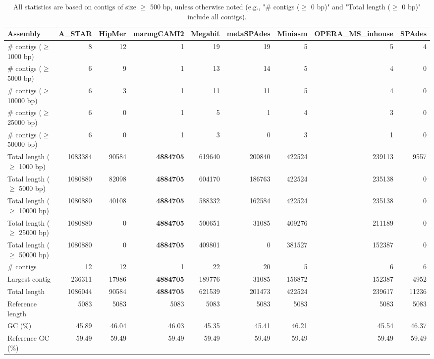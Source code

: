 \documentclass[12pt,a4paper]{article}
\begin{document}
\begin{table}[ht]
\begin{center}
\caption{All statistics are based on contigs of size $\geq$ 500 bp, unless otherwise noted (e.g., "\# contigs ($\geq$ 0 bp)" and "Total length ($\geq$ 0 bp)" include all contigs).}
\begin{tabular}{|l*{8}{|r}|}
\hline
Assembly & A\_STAR & HipMer & marmgCAMI2 & Megahit & metaSPAdes & Miniasm & OPERA\_MS\_inhouse & SPAdes \\ \hline
\# contigs ($\geq$ 1000 bp) & 8 & 12 & 1 & 19 & 19 & 5 & 5 & 4 \\ \hline
\# contigs ($\geq$ 5000 bp) & 6 & 9 & 1 & 13 & 14 & 5 & 4 & 0 \\ \hline
\# contigs ($\geq$ 10000 bp) & 6 & 3 & 1 & 11 & 11 & 5 & 4 & 0 \\ \hline
\# contigs ($\geq$ 25000 bp) & 6 & 0 & 1 & 5 & 1 & 4 & 3 & 0 \\ \hline
\# contigs ($\geq$ 50000 bp) & 6 & 0 & 1 & 3 & 0 & 3 & 1 & 0 \\ \hline
Total length ($\geq$ 1000 bp) & 1083384 & 90584 & {\bf 4884705} & 619640 & 200840 & 422524 & 239113 & 9557 \\ \hline
Total length ($\geq$ 5000 bp) & 1080880 & 82098 & {\bf 4884705} & 604170 & 186763 & 422524 & 235138 & 0 \\ \hline
Total length ($\geq$ 10000 bp) & 1080880 & 40108 & {\bf 4884705} & 588332 & 162584 & 422524 & 235138 & 0 \\ \hline
Total length ($\geq$ 25000 bp) & 1080880 & 0 & {\bf 4884705} & 500651 & 31085 & 409276 & 211189 & 0 \\ \hline
Total length ($\geq$ 50000 bp) & 1080880 & 0 & {\bf 4884705} & 409801 & 0 & 381527 & 152387 & 0 \\ \hline
\# contigs & 12 & 12 & 1 & 22 & 20 & 5 & 6 & 6 \\ \hline
Largest contig & 236311 & 17986 & {\bf 4884705} & 189776 & 31085 & 156872 & 152387 & 4952 \\ \hline
Total length & 1086044 & 90584 & {\bf 4884705} & 621539 & 201473 & 422524 & 239617 & 11236 \\ \hline
Reference length & 5083 & 5083 & 5083 & 5083 & 5083 & 5083 & 5083 & 5083 \\ \hline
GC (\%) & 45.89 & 46.04 & 46.03 & 45.35 & 45.41 & 46.21 & 45.54 & 46.37 \\ \hline
Reference GC (\%) & 59.49 & 59.49 & 59.49 & 59.49 & 59.49 & 59.49 & 59.49 & 59.49 \\ \hline

\end{tabular}
\end{center}
\end{table}
\end{document}
